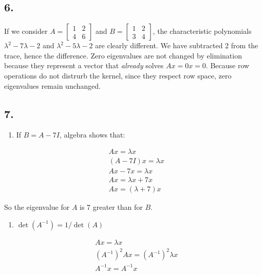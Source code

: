 \documentclass[
]{article}
\providecommand{\tightlist}{%
  \setlength{\itemsep}{0pt}\setlength{\parskip}{0pt}}
\begin{document}
\hypertarget{section-3}{%
\subsection{6.}\label{section-3}}

If we consider \(A = \begin{bmatrix}1 & 2\\4 & 6\end{bmatrix}\) and
\(B = \begin{bmatrix}1 & 2\\3 &4\end{bmatrix}\), the characteristic
polynomials \(\lambda^2 -7\lambda -2\) and \(\lambda^2 - 5\lambda -2\)
are clearly different. We have subtracted 2 from the trace, hence the
difference. Zero eigenvalues are not changed by elimination because they
represent a vector that \emph{already} solves \(Ax=0x=0\). Because row
operations do not distrurb the kernel, since they respect row space,
zero eigenvalues remain unchanged.

\hypertarget{section-4}{%
\subsection{7.}\label{section-4}}

\begin{enumerate}
\def\labelenumi{\alph{enumi}.}
\tightlist
\item
  If \(B = A - 7I\), algebra shows that:
\end{enumerate}

\[
  \begin{aligned}
    & Ax = \lambda x\\
    & (A-7I)x = \lambda x\\
    & Ax -7x = \lambda x\\
    & Ax = \lambda x + 7x \\
    & Ax = (\lambda + 7)x
  \end{aligned}
\]

So the eigenvalue for \(A\) is 7 greater than for \(B\).

\begin{enumerate}
\def\labelenumi{\alph{enumi}.}
\setcounter{enumi}{1}
\tightlist
\item
  \(\det(A^{-1}) = 1/ \det(A)\)
\end{enumerate}

\[
  \begin{aligned}
    & Ax = \lambda x\\
    & (A^{-1})^2Ax=(A^{-1})^2 \lambda x\\
    & A^{-1}x = A^{-1}x
  \end{aligned}
\]
\end{document}
